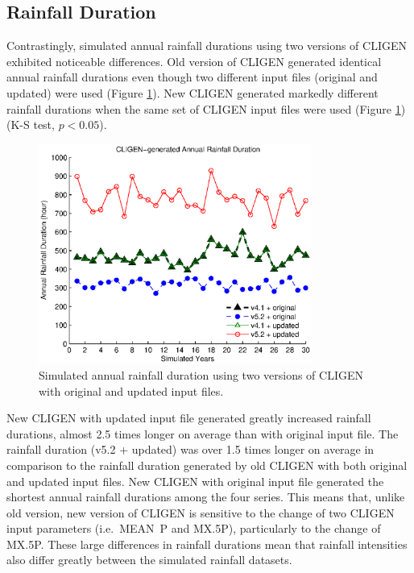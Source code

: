 \subsection{Rainfall Duration}
Contrastingly, simulated annual rainfall durations using two versions of CLIGEN
exhibited noticeable differences. Old version of CLIGEN generated identical
annual rainfall durations even though two different input files (original
and updated) were used (Figure \ref{fig:cligen_annual_duration}). New CLIGEN
generated markedly different rainfall durations when the same set of CLIGEN
input files were used (Figure \ref{fig:cligen_annual_duration}) (K-S test,
$p<0.05$).

\begin{figure}[htbp]
  \centering
\includegraphics[width=0.8\textwidth]{./img/cligen_annual_duration_series}
  \caption{Simulated annual rainfall duration using two versions of CLIGEN
with original and updated input files.}
  \label{fig:cligen_annual_duration}
\end{figure}

New CLIGEN with updated input file generated greatly increased rainfall
durations, almost 2.5 times longer on average than with original input file. The
rainfall duration (v5.2 + updated) was over 1.5 times longer on
average in comparison to the rainfall duration generated by old CLIGEN with both
original and updated input files. New CLIGEN with original input file
generated the shortest annual rainfall durations among the four series.
This means that, unlike old version, new version of CLIGEN is sensitive to
the change of two CLIGEN input parameters (i.e.\ MEAN~P and {MX.5P}),
particularly to the change of {MX.5P}. These large differences in rainfall
durations mean that rainfall intensities also differ greatly between the
simulated rainfall datasets.

